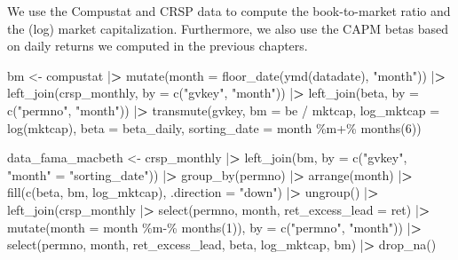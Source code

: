 \documentclass[
]{book}
\newenvironment{Shaded}{\begin{snugshade}}{\end{snugshade}}
\newcommand{\AttributeTok}[1]{\textcolor[rgb]{0.61,0.61,0.61}{#1}}
\newcommand{\DecValTok}[1]{\textcolor[rgb]{0.06,0.06,0.06}{#1}}
\newcommand{\ErrorTok}[1]{\textcolor[rgb]{0.14,0.14,0.14}{\textbf{#1}}}
\newcommand{\FunctionTok}[1]{\textcolor[rgb]{0,0,0}{#1}}
\newcommand{\NormalTok}[1]{#1}
\newcommand{\OtherTok}[1]{\textcolor[rgb]{0.37,0.37,0.37}{#1}}
\newcommand{\SpecialCharTok}[1]{\textcolor[rgb]{0,0,0}{#1}}
\newcommand{\StringTok}[1]{\textcolor[rgb]{0.5,0.5,0.5}{#1}}
\begin{document}
We use the Compustat and CRSP data to compute the book-to-market ratio and the (log) market capitalization.
Furthermore, we also use the CAPM betas based on daily returns we computed in the previous chapters.

\begin{Shaded}
\begin{Highlighting}[]
\NormalTok{bm }\OtherTok{\textless{}{-}}\NormalTok{ compustat }\SpecialCharTok{|}\ErrorTok{\textgreater{}}
  \FunctionTok{mutate}\NormalTok{(}\AttributeTok{month =} \FunctionTok{floor\_date}\NormalTok{(}\FunctionTok{ymd}\NormalTok{(datadate), }\StringTok{"month"}\NormalTok{)) }\SpecialCharTok{|}\ErrorTok{\textgreater{}}
  \FunctionTok{left\_join}\NormalTok{(crsp\_monthly, }\AttributeTok{by =} \FunctionTok{c}\NormalTok{(}\StringTok{"gvkey"}\NormalTok{, }\StringTok{"month"}\NormalTok{)) }\SpecialCharTok{|}\ErrorTok{\textgreater{}}
  \FunctionTok{left\_join}\NormalTok{(beta, }\AttributeTok{by =} \FunctionTok{c}\NormalTok{(}\StringTok{"permno"}\NormalTok{, }\StringTok{"month"}\NormalTok{)) }\SpecialCharTok{|}\ErrorTok{\textgreater{}}
  \FunctionTok{transmute}\NormalTok{(gvkey,}
            \AttributeTok{bm =}\NormalTok{ be }\SpecialCharTok{/}\NormalTok{ mktcap,}
            \AttributeTok{log\_mktcap =} \FunctionTok{log}\NormalTok{(mktcap),}
            \AttributeTok{beta =}\NormalTok{ beta\_daily,}
            \AttributeTok{sorting\_date =}\NormalTok{ month }\SpecialCharTok{\%m+\%} \FunctionTok{months}\NormalTok{(}\DecValTok{6}\NormalTok{))}

\NormalTok{data\_fama\_macbeth }\OtherTok{\textless{}{-}}\NormalTok{ crsp\_monthly }\SpecialCharTok{|}\ErrorTok{\textgreater{}}
  \FunctionTok{left\_join}\NormalTok{(bm, }\AttributeTok{by =} \FunctionTok{c}\NormalTok{(}\StringTok{"gvkey"}\NormalTok{, }\StringTok{"month"} \OtherTok{=} \StringTok{"sorting\_date"}\NormalTok{)) }\SpecialCharTok{|}\ErrorTok{\textgreater{}}
  \FunctionTok{group\_by}\NormalTok{(permno) }\SpecialCharTok{|}\ErrorTok{\textgreater{}}
  \FunctionTok{arrange}\NormalTok{(month) }\SpecialCharTok{|}\ErrorTok{\textgreater{}}
  \FunctionTok{fill}\NormalTok{(}\FunctionTok{c}\NormalTok{(beta, bm, log\_mktcap), }\AttributeTok{.direction =} \StringTok{"down"}\NormalTok{) }\SpecialCharTok{|}\ErrorTok{\textgreater{}}
  \FunctionTok{ungroup}\NormalTok{() }\SpecialCharTok{|}\ErrorTok{\textgreater{}}
  \FunctionTok{left\_join}\NormalTok{(crsp\_monthly }\SpecialCharTok{|}\ErrorTok{\textgreater{}}
              \FunctionTok{select}\NormalTok{(permno, month, }\AttributeTok{ret\_excess\_lead =}\NormalTok{ ret) }\SpecialCharTok{|}\ErrorTok{\textgreater{}}
              \FunctionTok{mutate}\NormalTok{(}\AttributeTok{month =}\NormalTok{ month }\SpecialCharTok{\%m{-}\%} \FunctionTok{months}\NormalTok{(}\DecValTok{1}\NormalTok{)),}
            \AttributeTok{by =} \FunctionTok{c}\NormalTok{(}\StringTok{"permno"}\NormalTok{, }\StringTok{"month"}\NormalTok{)) }\SpecialCharTok{|}\ErrorTok{\textgreater{}}
  \FunctionTok{select}\NormalTok{(permno, month, ret\_excess\_lead, beta, log\_mktcap, bm) }\SpecialCharTok{|}\ErrorTok{\textgreater{}}
  \FunctionTok{drop\_na}\NormalTok{()}
\end{Highlighting}
\end{Shaded}
\end{document}
